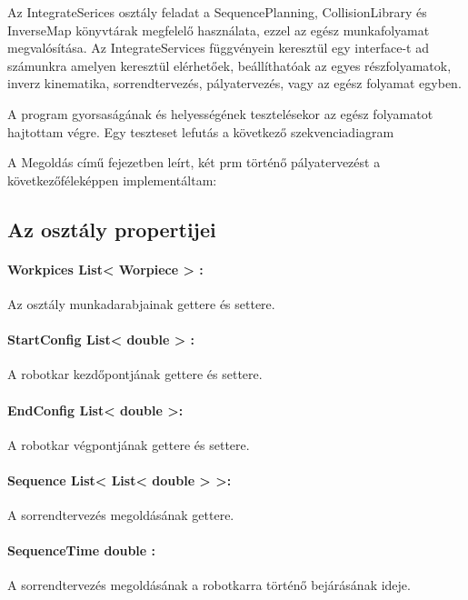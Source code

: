 Az IntegrateSerices osztály feladat a SequencePlanning, CollisionLibrary és InverseMap könyvtárak megfelelő használata, ezzel az egész munkafolyamat megvalósítása. Az IntegrateServices függvényein keresztül egy interface-t ad számunkra amelyen keresztül elérhetőek, beállíthatóak az egyes részfolyamatok, inverz kinematika, sorrendtervezés, pályatervezés, vagy az egész folyamat egyben.

A program gyorsaságának és helyességének tesztelésekor az egész folyamatot hajtottam végre. Egy teszteset lefutás a következő szekvenciadiagram 

A Megoldás című fejezetben leírt, két prm történő pályatervezést a következőféleképpen implementáltam:

\subsection{Az osztály propertijei}

\paragraph{Workpices List< Worpiece > :}

Az osztály munkadarabjainak gettere és settere.

\paragraph{StartConfig List< double > :}

A robotkar kezdőpontjának gettere és settere.

\paragraph{EndConfig List< double >:}

A robotkar végpontjának gettere és settere.

\paragraph{Sequence List< List< double > >:}

A sorrendtervezés megoldásának gettere.

\paragraph{SequenceTime double :}

A sorrendtervezés megoldásának a robotkarra történő bejárásának ideje.

